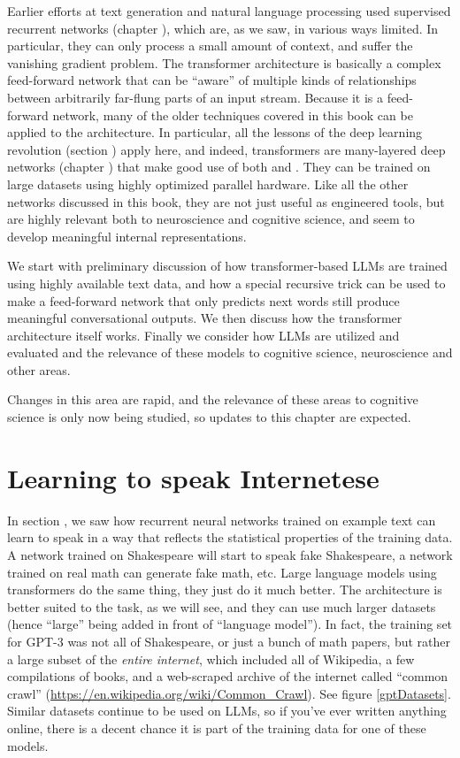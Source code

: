 Earlier efforts at text generation and natural language processing used supervised recurrent networks (chapter ), which are, as we saw, in various ways limited. In particular, they can only process a small amount of context, and suffer the vanishing gradient problem. The transformer architecture is basically a complex feed-forward network that can be ``aware'' of multiple kinds of relationships between arbitrarily far-flung parts of an input stream. Because it is a feed-forward network, many of the older techniques covered in this book can be applied to the architecture. In particular, all the lessons of the deep learning revolution (section ) apply here, and indeed, transformers are many-layered deep networks (chapter ) that make good use of both  and . They can be trained on large datasets using highly optimized parallel hardware. Like all the other networks discussed in this book, they are not just useful as engineered tools, but are highly relevant both to neuroscience and cognitive science, and seem to develop meaningful internal representations. 

We start with preliminary discussion of how transformer-based LLMs are trained using highly available text data, and how a special recursive trick can be used to make a feed-forward network that only predicts next words still produce meaningful conversational outputs. We then discuss how the transformer architecture itself works. Finally we consider how LLMs are utilized and evaluated and the relevance of these models to cognitive science, neuroscience and other areas.

Changes in this area are rapid, and the relevance of these areas to cognitive science is only now being studied, so updates to this chapter are expected.

\section{Learning to speak Internetese}

In section , we saw how recurrent neural networks trained on example text can learn to speak in a way that reflects the statistical properties of the training data. A network trained on Shakespeare will start to speak fake Shakespeare, a network trained on real math can generate fake math, etc. Large language models using transformers do the same thing, they just do it much better. The architecture is better suited to the task, as we will see, and they can use much larger datasets (hence ``large'' being added in front of ``language model''). In fact, the training set for GPT-3 was not all of Shakespeare, or just a bunch of math papers, but rather a large subset of the \emph{entire internet}, which included all of Wikipedia, a few compilations of books, and a web-scraped archive of the internet called ``common crawl'' (\url{https://en.wikipedia.org/wiki/Common_Crawl}). See figure \ref{gptDatasets}. Similar datasets continue to be used on LLMs, so if you've ever written anything online, there is a decent chance it is part of the training data for one of these models. 

